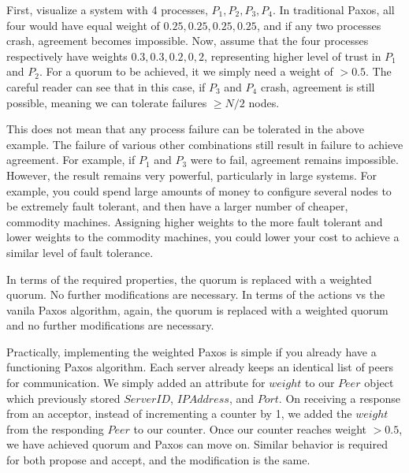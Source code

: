 \documentclass[conference]{IEEEtran}
\begin{document}
First, visualize a system with 4 processes, ${P_1, P_2, P_3, P_4}$. In traditional Paxos, all four would have equal weight of ${0.25, 0.25, 0.25, 0.25}$, and if any two processes crash, agreement becomes impossible. Now, assume that the four processes respectively have weights ${0.3, 0.3, 0.2, 0,2}$, representing higher level of trust in $P_1$ and $P_2$. For a quorum to be achieved, it we simply need a weight of $> 0.5$. The careful reader can see that in this case, if $P_3$ and $P_4$ crash, agreement is still possible, meaning we can tolerate failures $\geq N/2$ nodes.

This does not mean that any process failure can be tolerated in the above example. The failure of various other combinations still result in failure to achieve agreement. For example, if $P_1$ and $P_3$ were to fail, agreement remains impossible. However, the result remains very powerful, particularly in large systems. For example, you could spend large amounts of money to configure several nodes to be extremely fault tolerant, and then have a larger number of cheaper, commodity machines. Assigning higher weights to the more fault tolerant and lower weights to the commodity machines, you could lower your cost to achieve a similar level of fault tolerance.

In terms of the required properties, the quorum is replaced with a weighted quorum. No further modifications are necessary. In terms of the actions vs the vanila Paxos algorithm, again, the quorum is replaced with a weighted quorum and no further modifications are necessary.

Practically, implementing the weighted Paxos is simple if you already have a functioning Paxos algorithm. Each server already keeps an identical list of peers for communication. We simply added an attribute for $weight$ to our $Peer$ object which previously stored $ServerID$, $IPAddress$, and $Port$. On receiving a response from an acceptor, instead of incrementing a counter by 1, we added the $weight$ from the responding $Peer$ to our counter. Once our counter reaches weight $> 0.5$, we have achieved quorum and Paxos can move on. Similar behavior is required for both propose and accept, and the modification is the same. 
\end{document}
